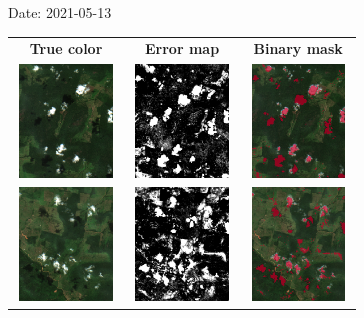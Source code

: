 \documentclass{beamer}
\begin{document}
\begin{frame}{Date: 2021-05-13}
    \begin{tabular}{ccc}
        \textbf{True color} & \textbf{Error map} & \textbf{Binary mask}\\
        \includegraphics[width=2.7cm,height=3cm]{Figures/v6/20210513/TCI_zoom5.png}& \includegraphics[width=2.7cm,height=3cm]{Figures/v6/20210513/error_map_zoom5.png} &\includegraphics[width=2.7cm,height=3cm]{Figures/v6/20210513/zoom5_BI.png}\\
        \includegraphics[width=2.7cm,height=3cm]{Figures/v6/20210513/TCI_zoom6.png}& \includegraphics[width=2.7cm,height=3cm]{Figures/v6/20210513/error_map_zoom6.png} &\includegraphics[width=2.7cm,height=3cm]{Figures/v6/20210513/zoom6_BI.png}\\
        \end{tabular}
\end{frame}
\end{document}
